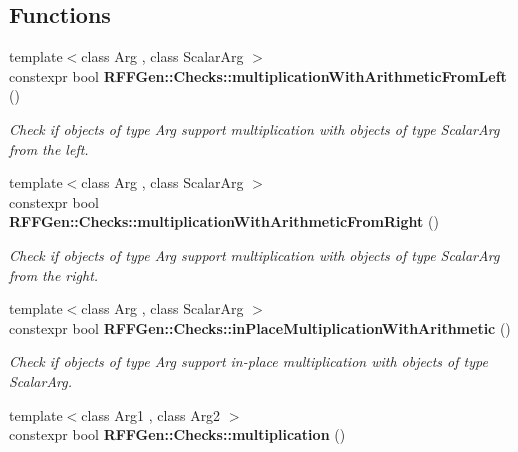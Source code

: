 \subsection*{Functions}
\begin{DoxyCompactItemize}
\item 
\hypertarget{namespaceRFFGen_1_1Checks_a8e6714272287c8628c51ed541df85d35}{{\footnotesize template$<$class Arg , class Scalar\-Arg $>$ }\\constexpr bool {\bfseries R\-F\-F\-Gen\-::\-Checks\-::multiplication\-With\-Arithmetic\-From\-Left} ()}\label{namespaceRFFGen_1_1Checks_a8e6714272287c8628c51ed541df85d35}

\begin{DoxyCompactList}\small\item\em Check if objects of type Arg support multiplication with objects of type Scalar\-Arg from the left. \end{DoxyCompactList}\item 
\hypertarget{namespaceRFFGen_1_1Checks_a2a264e0d0d599902e5ac0a0da0f0ec1d}{{\footnotesize template$<$class Arg , class Scalar\-Arg $>$ }\\constexpr bool {\bfseries R\-F\-F\-Gen\-::\-Checks\-::multiplication\-With\-Arithmetic\-From\-Right} ()}\label{namespaceRFFGen_1_1Checks_a2a264e0d0d599902e5ac0a0da0f0ec1d}

\begin{DoxyCompactList}\small\item\em Check if objects of type Arg support multiplication with objects of type Scalar\-Arg from the right. \end{DoxyCompactList}\item 
\hypertarget{namespaceRFFGen_1_1Checks_a68a111a3031cf901e8a38c103465053d}{{\footnotesize template$<$class Arg , class Scalar\-Arg $>$ }\\constexpr bool {\bfseries R\-F\-F\-Gen\-::\-Checks\-::in\-Place\-Multiplication\-With\-Arithmetic} ()}\label{namespaceRFFGen_1_1Checks_a68a111a3031cf901e8a38c103465053d}

\begin{DoxyCompactList}\small\item\em Check if objects of type Arg support in-\/place multiplication with objects of type Scalar\-Arg. \end{DoxyCompactList}\item 
\hypertarget{namespaceRFFGen_1_1Checks_a62147f3932a0706e2d40ce9a52da283c}{{\footnotesize template$<$class Arg1 , class Arg2 $>$ }\\constexpr bool {\bfseries R\-F\-F\-Gen\-::\-Checks\-::multiplication} ()}\label{namespaceRFFGen_1_1Checks_a62147f3932a0706e2d40ce9a52da283c}


\end{DoxyCompactItemize}
